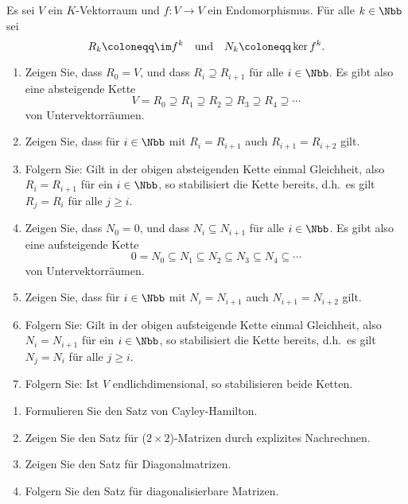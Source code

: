 \begin{question}
  Es sei $V$ ein $K$-Vektorraum und $f \colon V \to V$ ein Endomorphismus.
  Für alle $k \in \Nbb$ sei
  \[
    R_k \coloneqq \im f^k
    \quad\text{und}\quad
    N_k \coloneqq \ker f^k.
  \]
  \begin{enumerate}[leftmargin=*]
    \item
      Zeigen Sie, dass $R_0 = V$, und dass $R_i \supseteq R_{i+1}$ für alle $i \in \Nbb$.
      Es gibt also eine absteigende Kette
      \[
        V = R_0 \supseteq R_1 \supseteq R_2 \supseteq R_3 \supseteq R_4 \supseteq \dotsb
      \]
      von Untervektorräumen.
    \item
      Zeigen Sie, dass für $i \in \Nbb$ mit $R_i = R_{i+1}$ auch $R_{i+1} = R_{i+2}$ gilt.
    \item
      Folgern Sie:
      Gilt in der obigen absteigenden Kette einmal Gleichheit, also $R_i = R_{i+1}$ für ein $i \in \Nbb$, so stabilisiert die Kette bereits, d.h.\ es gilt $R_j = R_i$ für alle $j \geq i$.
    \item
      Zeigen Sie, dass $N_0 = 0$, und dass $N_i \subseteq N_{i+1}$ für alle $i \in \Nbb$.
      Es gibt also eine aufsteigende Kette
      \[
        0 = N_0 \subseteq N_1 \subseteq N_2 \subseteq N_3 \subseteq N_4 \subseteq \dotsb
      \]
      von Untervektorräumen.
    \item
      Zeigen Sie, dass für $i \in \Nbb$ mit $N_i = N_{i+1}$ auch $N_{i+1} = N_{i+2}$ gilt.
    \item
      Folgern Sie:
      Gilt in der obigen aufsteigende Kette einmal Gleichheit, also $N_i = N_{i+1}$ für ein $i \in \Nbb$, so stabilisiert die Kette bereits, d.h.\ es gilt $N_j = N_i$ für alle $j \geq i$.
    \item
      Folgern Sie:
      Ist $V$ endlichdimensional, so stabilisieren beide Ketten.
  \end{enumerate}
\end{question}


\begin{question}
  \begin{enumerate}[leftmargin=*]
    \item
      Formulieren Sie den Satz von Cayley-Hamilton.
    \item
      Zeigen Sie den Satz für ($2 \times 2$)-Matrizen durch explizites Nachrechnen.
    \item
      Zeigen Sie den Satz für Diagonalmatrizen.
    \item
      Folgern Sie den Satz für diagonalisierbare Matrizen.
  \end{enumerate}
\end{question}


